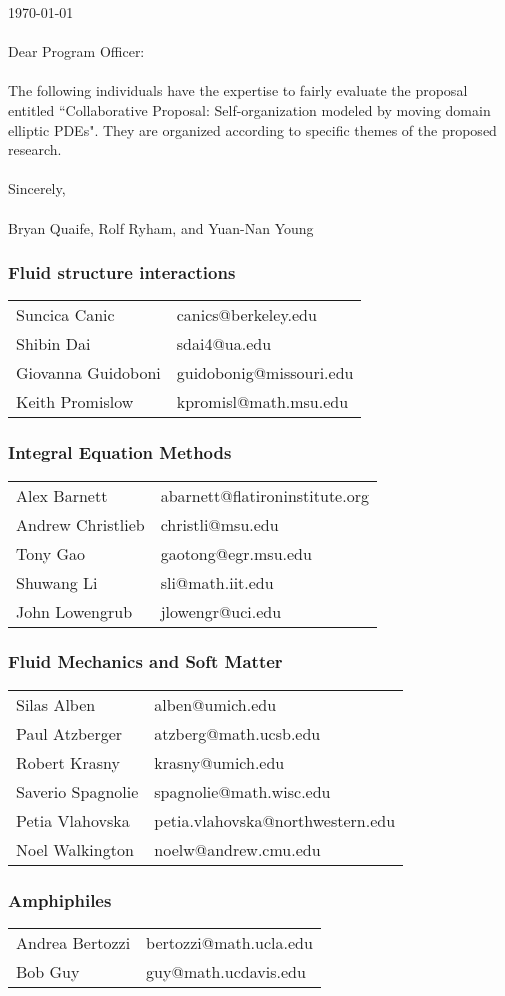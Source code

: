 \documentclass[11pt]{article}
\begin{document}
\sloppy

\noindent
\today \\ \\
Dear Program Officer:
\\ \\
\noindent
The following individuals have the expertise to fairly evaluate the 
proposal entitled ``Collaborative Proposal: Self-organization modeled by
moving domain elliptic PDEs". They are organized according to specific
themes of the proposed research.
\\ \\
Sincerely, \\ \\
Bryan Quaife, Rolf Ryham, and Yuan-Nan Young \\

\subsubsection*{Fluid structure interactions}
\begin{tabular}{ll}
  Suncica Canic & canics@berkeley.edu \\
  Shibin Dai & sdai4@ua.edu \\
  Giovanna Guidoboni \qquad & guidobonig@missouri.edu \\
  Keith Promislow & kpromisl@math.msu.edu
\end{tabular}


\subsubsection*{Integral Equation Methods}
\begin{tabular}{ll}
  Alex Barnett & abarnett@flatironinstitute.org \\
  Andrew Christlieb \qquad &christli@msu.edu \\
  Tony Gao & gaotong@egr.msu.edu \\
  Shuwang Li & sli@math.iit.edu \\
  John Lowengrub & jlowengr@uci.edu
\end{tabular}


\subsubsection*{Fluid Mechanics and Soft Matter}
\begin{tabular}{ll}
Silas Alben & alben@umich.edu \\
  Paul Atzberger & atzberg@math.ucsb.edu \\
Robert Krasny & krasny@umich.edu \\
Saverio Spagnolie \qquad & spagnolie@math.wisc.edu \\
Petia Vlahovska & petia.vlahovska@northwestern.edu \\
Noel Walkington & noelw@andrew.cmu.edu 
\end{tabular}


\subsubsection*{Amphiphiles}
\begin{tabular}{ll}
Andrea Bertozzi & bertozzi@math.ucla.edu \\
Bob Guy & guy@math.ucdavis.edu 
\end{tabular}
\end{document}
